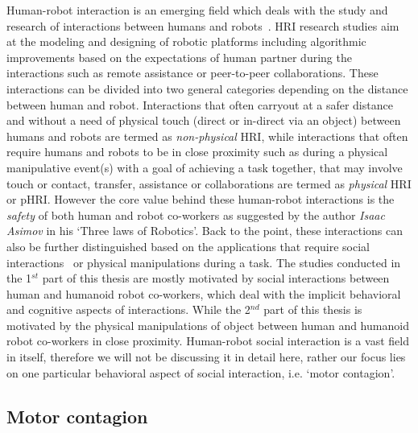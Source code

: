Human-robot interaction is an emerging field which deals with the study and research of interactions between humans and robots~\cite{goodrich2008human}. HRI research studies aim at the modeling and designing of robotic platforms including algorithmic improvements based on the expectations of human partner during the interactions such as remote assistance or peer-to-peer collaborations. These interactions can be divided into two general categories depending on the distance between human and robot. Interactions that often carryout at a safer distance and without a need of physical touch (direct or in-direct via an object) between humans and robots are termed as \textit{non-physical} HRI, while interactions that often require humans and robots to be in close proximity such as during a physical manipulative event(s) with a goal of achieving a task together, that may involve touch or contact, transfer, assistance or collaborations are termed as \textit{physical} HRI or pHRI. However the core value behind these human-robot interactions is the \textit{safety} of both human and robot co-workers as suggested by the author \textit{Isaac Asimov} in his `Three laws of Robotics'. Back to the point, these interactions can also be further distinguished based on the applications that require social interactions~\cite{tzafestas2016human, Chaminade:JPP:2009} or physical manipulations during a task. The studies conducted in the 1$^{st}$ part of this thesis are mostly motivated by social interactions between human and humanoid robot co-workers, which deal with the implicit behavioral and cognitive aspects of interactions. While the 2$^{nd}$ part of this thesis is motivated by the physical manipulations of object between human and humanoid robot co-workers in close proximity. Human-robot social interaction is a vast field in itself, therefore we will not be discussing it in detail here, rather our focus lies on one particular behavioral aspect of social interaction, i.e. `motor contagion'.


\subsection{Motor contagion}\label{motor contagions}

